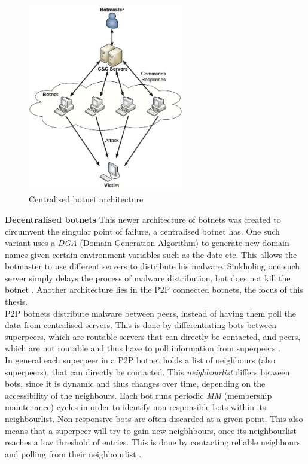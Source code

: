 \documentclass{article}
\begin{document}
\begin{figure}[H]
    \centering
    \includegraphics[width=6.8cm]{CentralisedBotnet.png}
    \caption{Centralised botnet architecture \cite{SurveyArchitectures}}
    \label{fig:CentralisedArchitecture}
\end{figure}

\textbf{Decentralised botnets}  This newer architecture of botnets was created to circumvent the singular point of failure, a centralised botnet has. One such variant uses a \emph{DGA} (Domain Generation Algorithm) to generate new domain names given certain environment variables such as the date etc. This allows the botmaster to use different servers to distribute his malware. Sinkholing one such server simply delays the process of malware distribution, but does not kill the botnet \cite{AMP2P}. Another architecture lies in the P2P connected botnets, the focus of this thesis. \\

P2P botnets distribute malware between peers, instead of having them poll the data from centralised servers. This is done by differentiating bots between superpeers, which are routable servers that can directly be contacted, and peers, which are not routable and thus have to poll information from superpeers \cite{AMP2P}. \\

In general each superpeer in a P2P botnet holds a list of neighbours (also superpeers), that can directly be contacted. This \emph{neighbourlist} differs between bots, since it is dynamic and thus changes over time, depending on the accessibility of the neighbours. Each bot runs periodic \emph{MM} (membership maintenance) cycles in order to identify non responsible bots within its neighbourlist. Non responsive bots are often discarded at a given point. This also means that a superpeer will try to gain new neigbhbours, once its neighbourlist reaches a low threshold of entries. This is done by contacting reliable neighbours and polling from their neighbourlist \cite{AMP2P}.
\end{document}
